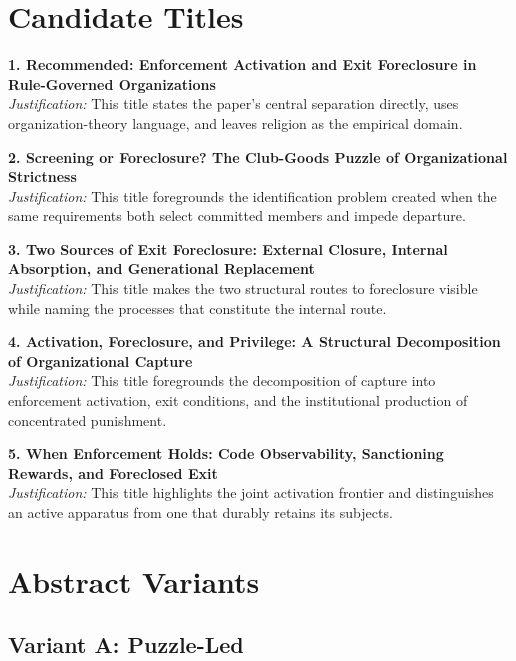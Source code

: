 \section*{Candidate Titles}

\noindent\textbf{1. Recommended: Enforcement Activation and Exit Foreclosure in Rule-Governed Organizations}\\
\textit{Justification:} This title states the paper's central separation directly, uses organization-theory language, and leaves religion as the empirical domain.

\noindent\textbf{2. Screening or Foreclosure? The Club-Goods Puzzle of Organizational Strictness}\\
\textit{Justification:} This title foregrounds the identification problem created when the same requirements both select committed members and impede departure.

\noindent\textbf{3. Two Sources of Exit Foreclosure: External Closure, Internal Absorption, and Generational Replacement}\\
\textit{Justification:} This title makes the two structural routes to foreclosure visible while naming the processes that constitute the internal route.

\noindent\textbf{4. Activation, Foreclosure, and Privilege: A Structural Decomposition of Organizational Capture}\\
\textit{Justification:} This title foregrounds the decomposition of capture into enforcement activation, exit conditions, and the institutional production of concentrated punishment.

\noindent\textbf{5. When Enforcement Holds: Code Observability, Sanctioning Rewards, and Foreclosed Exit}\\
\textit{Justification:} This title highlights the joint activation frontier and distinguishes an active apparatus from one that durably retains its subjects.

\section*{Abstract Variants}

\subsection*{Variant A: Puzzle-Led}

